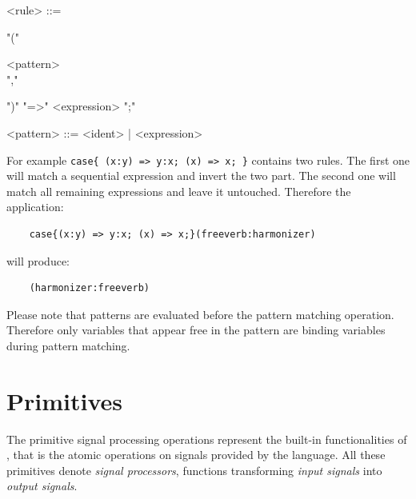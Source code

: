 \documentclass[a4paper]{book}
\begin{document}
\begin{grammar}
  <rule> ::= 
  \begin{syntdiag} 
    "("
    \begin{rep}
      <pattern> \\ ","
    \end{rep}
    ")" "=>" <expression> ";"
  \end{syntdiag}
\end{grammar}

\begin{grammar}
  <pattern> ::= 
    <ident> | <expression>
\end{grammar}


For example \lstinline'case{ (x:y) => y:x; (x) => x; }' contains two rules. The first one will match a sequential expression and invert the two part. The second one will match all remaining expressions and leave it untouched. Therefore the application:

\begin{lstlisting}
	case{(x:y) => y:x; (x) => x;}(freeverb:harmonizer)
\end{lstlisting}

will produce:

\begin{lstlisting}
	(harmonizer:freeverb)
\end{lstlisting}

Please note that patterns are evaluated before the pattern matching operation. Therefore only variables that appear free in the pattern are binding variables during pattern matching. 



\section{Primitives}
\label{primitives}
The primitive signal processing operations represent the built-in functionalities of \faust, that is the atomic operations on signals provided by the language. All these primitives denote \emph{signal processors}, functions transforming \emph{input signals} into \emph{output signals}.
\end{document}

